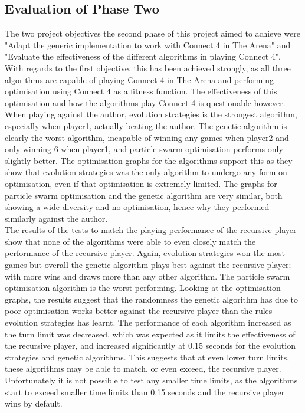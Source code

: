 \subsection{Evaluation of Phase Two}
The two project objectives the second phase of this project aimed to achieve were "Adapt the generic implementation to work with Connect 4 in The Arena" and "Evaluate the effectiveness of the different algorithms in playing Connect 4". With regards to the first objective, this has been achieved strongly, as all three algorithms are capable of playing Connect 4 in The Arena and performing optimisation using Connect 4 as a fitness function. The effectiveness of this optimisation and how the algorithms play Connect 4 is questionable however. 
\\When playing against the author, evolution strategies is the strongest algorithm, especially when player1, actually beating the author. The genetic algorithm is clearly the worst algorithm, incapable of winning any games when player2 and only winning 6 when player1, and particle swarm optimisation performs only slightly better. The optimisation graphs for the algorithms support this as they show that evolution strategies was the only algorithm to undergo any form on optimisation, even if that optimisation is extremely limited. The graphs for particle swarm optimisation and the genetic algorithm are very similar, both showing a wide diversity and no optimisation, hence why they performed similarly against the author.
\\The results of the tests to match the playing performance of the recursive player show that none of the algorithms were able to even closely match the performance of the recursive player. Again, evolution strategies won the most games but overall the genetic algorithm plays best against the recursive player; with more wins and draws more than any other algorithm. The particle swarm optimisation algorithm is the worst performing. Looking at the optimisation graphs, the results suggest that the randomness the genetic algorithm has due to poor optimisation works better against the recursive player than the rules evolution strategies has learnt. The performance of each algorithm increased as the turn limit was decreased, which was expected as it limits the effectiveness of the recursive player, and increased significantly at 0.15 seconds for the evolution strategies and genetic algorithms. This suggests that at even lower turn limits, these algorithms may be able to match, or even exceed, the recursive player. Unfortunately it is not possible to test any smaller time limits, as the algorithms start to exceed smaller time limits than 0.15 seconds and the recursive player wins by default.
